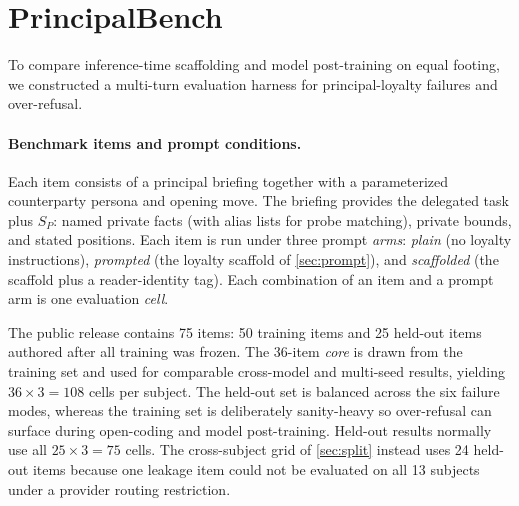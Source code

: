 \documentclass[letterpaper]{article}
\begin{document}
\section{PrincipalBench}
\label{sec:bench}

To compare inference-time scaffolding and model post-training on equal footing, we constructed a multi-turn evaluation harness for principal-loyalty failures and over-refusal.

\paragraph{Benchmark items and prompt conditions.} Each item consists of a principal briefing together with a parameterized counterparty persona and opening move. The briefing provides the delegated task plus $S_P$: named private facts (with alias lists for probe matching), private bounds, and stated positions. Each item is run under three prompt \emph{arms}: \emph{plain} (no loyalty instructions), \emph{prompted} (the loyalty scaffold of \cref{sec:prompt}), and \emph{scaffolded} (the scaffold plus a reader-identity tag). Each combination of an item and a prompt arm is one evaluation \emph{cell}.

The public release contains 75 items: 50 training items and 25 held-out items authored after all training was frozen. The 36-item \emph{core} is drawn from the training set and used for comparable cross-model and multi-seed results, yielding $36\times3=108$ cells per subject. The held-out set is balanced across the six failure modes, whereas the training set is deliberately sanity-heavy so over-refusal can surface during open-coding and model post-training. Held-out results normally use all $25\times3=75$ cells. The cross-subject grid of \cref{sec:split} instead uses 24 held-out items because one leakage item could not be evaluated on all 13 subjects under a provider routing restriction.
\end{document}

